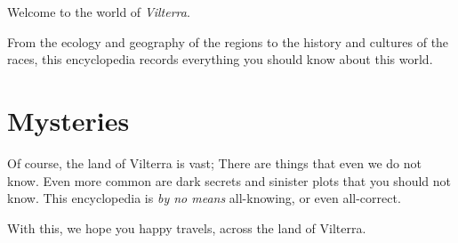 \documentclass[../main.tex]{subfiles}
\begin{document}
Welcome to the world of \emph{Vilterra}.

From the ecology and geography of the regions
to the history and cultures of the races, this encyclopedia records everything you
should know about this world.

\section{Mysteries}
Of course, the land of Vilterra is vast; There are things that even
we do not know. Even more common are dark secrets and sinister plots that
you should not know. This encyclopedia is \emph{by no means} all-knowing, or even
all-correct.

With this, we hope you happy travels, across the land of Vilterra.
\end{document}
